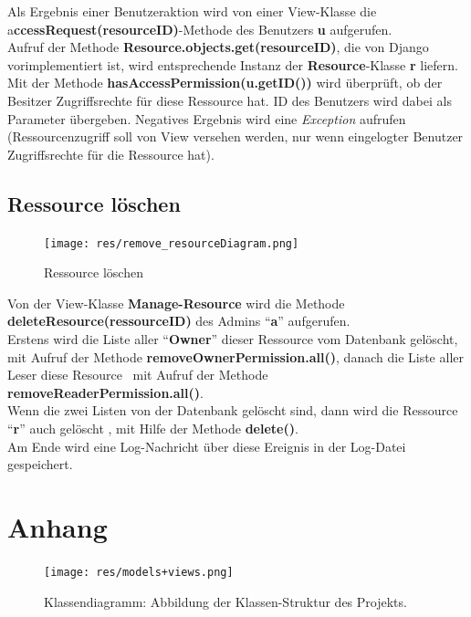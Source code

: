 \documentclass[parskip=full,11pt]{scrartcl}
\begin{document}
Als Ergebnis einer Benutzeraktion wird von einer View-Klasse die a\textbf{ccessRequest(resourceID)}-Methode des Benutzers \textbf{u} aufgerufen.\\
Aufruf der Methode \textbf{Resource.objects.get(resourceID)}, die von Django vorimplementiert ist, wird entsprechende Instanz der \textbf{Resource}-Klasse \textbf{r} liefern.\\
Mit der Methode\textbf{ hasAccessPermission(u.getID())} wird überprüft, ob der Besitzer Zugriffsrechte für diese Ressource hat. ID des Benutzers wird dabei als Parameter übergeben. Negatives Ergebnis wird eine \textit{Exception} aufrufen (Ressourcenzugriff soll von View versehen werden, nur wenn eingelogter Benutzer Zugriffsrechte für die Ressource hat).
 
 
 \newpage
 
 \subsection{Ressource löschen}
 \begin{figure}[ht!]
 	\centering
 	\texttt{[image: res/remove\_resourceDiagram.png]}
 	\caption{Ressource löschen}
 \end{figure}
 
 
Von der View-Klasse \textbf{Manage-Resource} wird die Methode \textbf{deleteResource(ressourceID)} des Admins \enquote{\textbf{a}}  aufgerufen.\\ Erstens wird die Liste aller \enquote{\textbf{Owner}} dieser Ressource vom Datenbank gelöscht, mit Aufruf der Methode \textbf{removeOwnerPermission.all()}, danach die Liste aller Leser diese Resource \ mit Aufruf der Methode \textbf{removeReaderPermission.all()}.\\
Wenn die zwei Listen von der Datenbank gelöscht sind, dann wird die Ressource \enquote{\textbf{r}} auch gelöscht , mit Hilfe der Methode \textbf{delete()}.\\ Am Ende wird eine Log-Nachricht über diese Ereignis  in der Log-Datei gespeichert.\\
 
 \newpage
 \section{Anhang}
 \begin{figure}[ht!]
 	\centering
 	\texttt{[image: res/models+views.png]}
 	\caption{Klassendiagramm: Abbildung der Klassen-Struktur des Projekts.}
 \end{figure}
 \newpage
{}
\printglossary	
	
 
\end{document}
